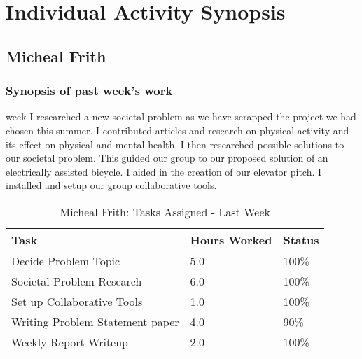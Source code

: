 \documentclass[12pt,article,compsoc]{IEEEtran}
\begin{document}
	\clearpage

\section{Individual Activity Synopsis}
	\subsection{Micheal Frith}

	\subsubsection*{Synopsis of past week's work}

	 week I researched a new societal problem as we have scrapped the project we had chosen this summer. 
	I contributed articles and research on physical activity and its effect on physical and mental health. 
	I then researched possible solutions to our societal problem. This guided our group to our proposed 
	solution of an electrically assisted bicycle.	I aided in the creation of our elevator pitch.
	I installed and setup our group collaborative tools. 

	\begin{table}[ht]
	\renewcommand{\arraystretch}{1.3}
		\caption{Micheal Frith: Tasks Assigned - Last Week}
		
		\label{Summary of Micheal Frith's activities: last week}
		
		\centering
		\begin{tabular}{p{5.5cm}|p{1cm}|p{1cm}} 
		\hline
		\bfseries 	Task		 		& \bfseries Hours Worked	& \bfseries Status	\\
		\hline\hline	
					Decide Problem Topic					& 5.0						& 100\%				\\
					Societal Problem Research				& 6.0						& 100\%				\\	%
					Set up Collaborative Tools				& 1.0						& 100\%				\\
					Writing Problem Statement paper			& 4.0						& 90\%				\\
					Weekly Report Writeup					& 2.0						& 100\%				\\
		\hline
		\end{tabular}
	\end{table}
\end{document}
